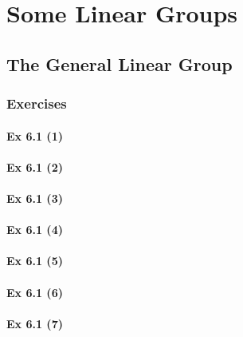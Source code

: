 \setcounter{chapter}{0}
\renewcommand{\thechapter}{6}
\chapter{Some Linear Groups}\label{ch:6}
\setcounter{equation}{0}	        %

\section{The General Linear Group}\label{sec:6.1}
\subsection{Exercises}\label{sec:6.1_Exercises}

\subsubsection{Ex 6.1 (1)}\label{sec:Ex_6.1.1}

\subsubsection{Ex 6.1 (2)}\label{sec:Ex_6.1.2}

\subsubsection{Ex 6.1 (3)}\label{sec:Ex_6.1.3}

\subsubsection{Ex 6.1 (4)}\label{sec:Ex_6.1.4}

\subsubsection{Ex 6.1 (5)}\label{sec:Ex_6.1.5}

\subsubsection{Ex 6.1 (6)}\label{sec:Ex_6.1.6}

\subsubsection{Ex 6.1 (7)}\label{sec:Ex_6.1.7}

